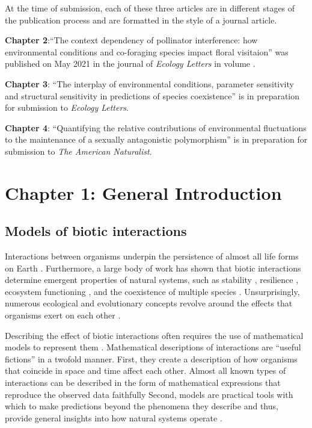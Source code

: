 \documentclass[12pt]{article}
\begin{document}
At the time of submission, each of these three articles are in different stages of the publication process and are formatted in the style of a journal article.

\textbf{Chapter 2}:``The context dependency of pollinator interference: how environmental conditions and co-foraging species impact floral visitaion'' was published on May 2021 in the journal of  \textit{Ecology Letters} in volume .

\textbf{Chapter 3}: ``The interplay of environmental conditions, parameter sensitivity and structural sensitivity in predictions of species coexistence'' is in preparation for submission to \textit{Ecology Letters}.

\textbf{Chapter 4}: ``Quantifying the relative contributions of environmental fluctuations to the maintenance of a sexually antagonistic polymorphism'' is in preparation for submission to \textit{The American Naturalist}.

\clearpage
\section*{Chapter 1: General Introduction}
\subsection*{Models of biotic interactions}
Interactions between organisms underpin the persistence of almost all life forms on Earth \citep{lawton1999there}. Furthermore, a large body of work has shown that biotic interactions determine emergent properties of natural systems, such as stability \citep{may1972will, wootton2016many,song2018will}, resilience \citep{capdevila2021reconciling}, ecosystem functioning \citep{turnbull2013coexistence,godoy2020excess}, and the coexistence of multiple species \citep{chesson2000mechanisms,saavedra2017structural}. Unsurprisingly, numerous ecological and evolutionary concepts revolve around the effects that organisms exert on each other \citep{gause_experimental_1934,macarthur1967limiting,thompson1999evolution, hillerislambers2012rethinking, chase2009ecological}.

Describing the effect of biotic interactions often requires the use of mathematical models to represent them \citep{maynard1978models,rossberg2019let}. Mathematical descriptions of interactions are ``useful fictions'' \citep{box2011statistical} in a twofold manner. First, they create a description of how organisms that coincide in space and time affect each other. Almost all known types of interactions can be described in the form of mathematical expressions that reproduce the observed data faithfully \citep{volterra1926fluctuations,holling1959some,holt1977predation,adler2018competition,wood1999super,holland2002population,vazquez2005interaction,stouffer2021hidden}  Second, models are practical tools with which to make predictions beyond the phenomena they describe and thus, provide general insights into how natural systems operate \citep{evans2012predictive,stouffer2019all,rossberg2019let}.
\end{document}
